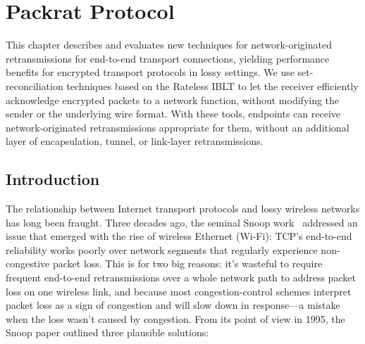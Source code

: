 \chapter{Packrat Protocol}
\label{sec:packrat}

This chapter describes and evaluates new techniques for
network-originated retransmissions for end-to-end transport
connections, yielding performance benefits for encrypted transport
protocols in lossy settings.  We use set-reconciliation techniques
based on the Rateless IBLT to let the receiver efficiently acknowledge
encrypted packets to a network function, without modifying the sender
or the underlying wire format. With these tools, endpoints can receive
network-originated retransmissions appropriate for them, without an
additional layer of encapsulation, tunnel, or link-layer
retransmissions.

\section{Introduction}
\label{sec:packrat:intro}

The relationship between Internet transport protocols and lossy
wireless networks has long been fraught. Three decades ago, the
seminal Snoop work~\cite{balakrishnan1995snoop} addressed an issue
that emerged with the rise of wireless Ethernet (Wi-Fi): TCP's
end-to-end reliability works poorly over network segments that
regularly experience non-congestive packet loss. This is for two big
reasons: it's wasteful to require frequent end-to-end retransmissions
over a whole network path to address packet loss on one wireless link,
and because most congestion-control schemes interpret packet loss as a
sign of congestion and will slow down in response---a mistake when the
loss wasn't caused by congestion. From its point of view in 1995, the
Snoop paper outlined three plausible solutions:

